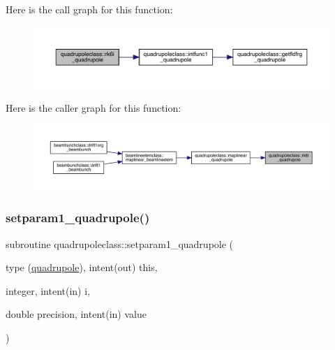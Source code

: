 Here is the call graph for this function\+:\nopagebreak
\begin{figure}[H]
\begin{center}
\leavevmode
\includegraphics[width=350pt]{namespacequadrupoleclass_a156f69f00644d8511e9f1ee150504b83_cgraph}
\end{center}
\end{figure}
Here is the caller graph for this function\+:\nopagebreak
\begin{figure}[H]
\begin{center}
\leavevmode
\includegraphics[width=350pt]{namespacequadrupoleclass_a156f69f00644d8511e9f1ee150504b83_icgraph}
\end{center}
\end{figure}
\mbox{\label{namespacequadrupoleclass_a34d611929c447e03e1c12c2f72888ca5}} 
\subsubsection{\texorpdfstring{setparam1\_quadrupole()}{setparam1\_quadrupole()}}
{\footnotesize\ttfamily subroutine quadrupoleclass\+::setparam1\+\_\+quadrupole (\begin{DoxyParamCaption}\item[{type (\mbox{\hyperlink{namespacequadrupoleclass_structquadrupoleclass_1_1quadrupole}{quadrupole}}), intent(out)}]{this,  }\item[{integer, intent(in)}]{i,  }\item[{double precision, intent(in)}]{value }\end{DoxyParamCaption})}

\mbox{\label{namespacequadrupoleclass_a400dc2305f0aca6ab6d6b5475a91363a}} 

